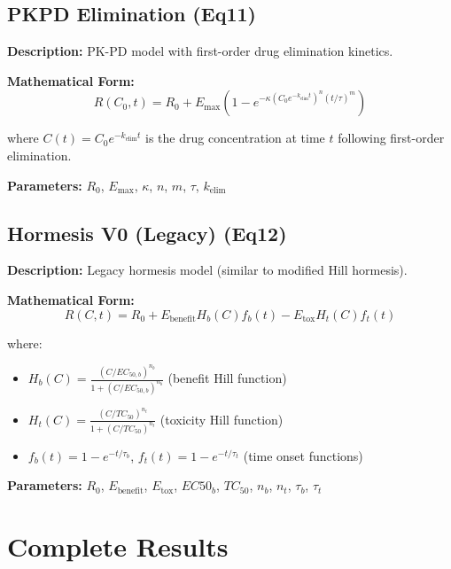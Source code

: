 \documentclass[11pt,a4paper]{article}
\begin{document}
\subsection{PKPD Elimination (Eq11)}

\textbf{Description:} PK-PD model with first-order drug elimination kinetics.

\textbf{Mathematical Form:}
\begin{equation}
R(C_0,t) = R_0 + E_{\mathrm{max}}\left(1 - e^{-\kappa (C_0 e^{-k_{\mathrm{elim}} t})^n (t/\tau)^m}\right)
\end{equation}

where $C(t) = C_0 e^{-k_{\mathrm{elim}} t}$ is the drug concentration at time $t$ following first-order elimination.

\textbf{Parameters:} $R_0$, $E_{\mathrm{max}}$, $\kappa$, $n$, $m$, $\tau$, $k_{\mathrm{elim}}$


\subsection{Hormesis V0 (Legacy) (Eq12)}

\textbf{Description:} Legacy hormesis model (similar to modified Hill hormesis).

\textbf{Mathematical Form:}
\begin{equation}
R(C,t) = R_0 + E_{\mathrm{benefit}} H_b(C) f_b(t) - E_{\mathrm{tox}} H_t(C) f_t(t)
\end{equation}

where:
\begin{itemize}
\item $H_b(C) = \frac{(C/EC_{50,b})^{n_b}}{1 + (C/EC_{50,b})^{n_b}}$ (benefit Hill function)
\item $H_t(C) = \frac{(C/TC_{50})^{n_t}}{1 + (C/TC_{50})^{n_t}}$ (toxicity Hill function)
\item $f_b(t) = 1 - e^{-t/\tau_b}$, $f_t(t) = 1 - e^{-t/\tau_t}$ (time onset functions)
\end{itemize}

\textbf{Parameters:} $R_0$, $E_{\mathrm{benefit}}$, $E_{\mathrm{tox}}$, $EC50_b$, $TC_{50}$, $n_b$, $n_t$, $\tau_b$, $\tau_t$


\newpage

\section{Complete Results}
\end{document}
